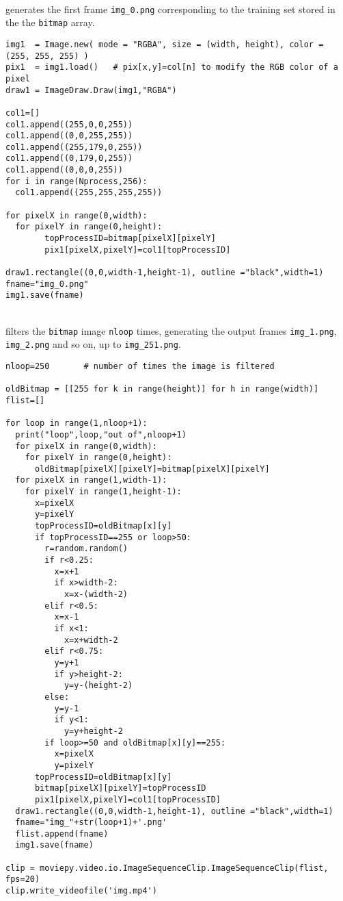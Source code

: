 \documentclass[10pt]{article}
\begin{document}
\quad \\
 generates the first frame \texttt{img\_0.png} corresponding to the training set stored in the the \texttt{bitmap} array.
\begin{lstlisting}
img1  = Image.new( mode = "RGBA", size = (width, height), color = (255, 255, 255) )
pix1  = img1.load()   # pix[x,y]=col[n] to modify the RGB color of a pixel
draw1 = ImageDraw.Draw(img1,"RGBA")

col1=[]
col1.append((255,0,0,255))
col1.append((0,0,255,255))
col1.append((255,179,0,255))
col1.append((0,179,0,255))
col1.append((0,0,0,255))
for i in range(Nprocess,256):
  col1.append((255,255,255,255))

for pixelX in range(0,width):
  for pixelY in range(0,height):
        topProcessID=bitmap[pixelX][pixelY]
        pix1[pixelX,pixelY]=col1[topProcessID]

draw1.rectangle((0,0,width-1,height-1), outline ="black",width=1)
fname="img_0.png"
img1.save(fname)
\end{lstlisting}
\quad \\
 filters the \texttt{bitmap} image \texttt{nloop} times, generating the output frames \texttt{img\_1.png}, \texttt{img\_2.png} and so on, up to \texttt{img\_251.png}.
\begin{lstlisting}
nloop=250       # number of times the image is filtered

oldBitmap = [[255 for k in range(height)] for h in range(width)]
flist=[]

for loop in range(1,nloop+1):
  print("loop",loop,"out of",nloop+1)
  for pixelX in range(0,width):
    for pixelY in range(0,height):
      oldBitmap[pixelX][pixelY]=bitmap[pixelX][pixelY]
  for pixelX in range(1,width-1):
    for pixelY in range(1,height-1):
      x=pixelX
      y=pixelY
      topProcessID=oldBitmap[x][y]
      if topProcessID==255 or loop>50:
        r=random.random()
        if r<0.25:
          x=x+1
          if x>width-2:
            x=x-(width-2)
        elif r<0.5:
          x=x-1
          if x<1:
            x=x+width-2
        elif r<0.75:
          y=y+1
          if y>height-2:
            y=y-(height-2)
        else:
          y=y-1
          if y<1:
            y=y+height-2
        if loop>=50 and oldBitmap[x][y]==255:
          x=pixelX
          y=pixelY
      topProcessID=oldBitmap[x][y]
      bitmap[pixelX][pixelY]=topProcessID
      pix1[pixelX,pixelY]=col1[topProcessID]
  draw1.rectangle((0,0,width-1,height-1), outline ="black",width=1)
  fname="img_"+str(loop+1)+'.png'
  flist.append(fname)
  img1.save(fname)

clip = moviepy.video.io.ImageSequenceClip.ImageSequenceClip(flist, fps=20)
clip.write_videofile('img.mp4')
\end{lstlisting}
\end{document}
